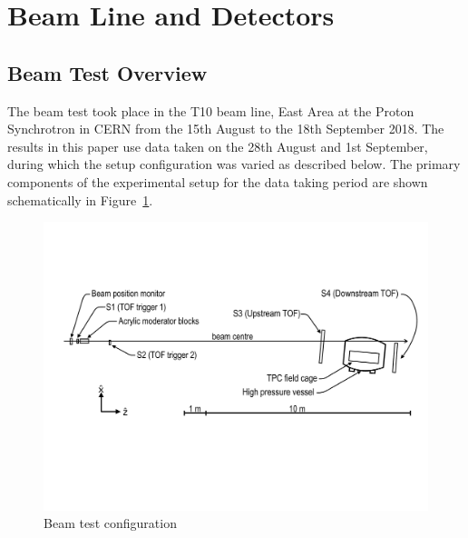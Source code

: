 \section{Beam Line and Detectors}
\label{hptpcPaper:sec:Methods}

\subsection{Beam Test Overview}
The beam test took place in the T10 beam line, East Area at the Proton Synchrotron in CERN from the 15th August to the 18th September 2018.
The results in this paper use data taken on the 28th August and 1st September, during which the setup configuration was varied as described below.
The primary components of the  experimental setup for the data taking period are shown schematically in Figure~\ref{fig:setup}.

\begin{figure}
  \includegraphics[width=1.0\linewidth]{files/Figures/hptpc_t10_planview.pdf}
  \caption{Beam test configuration}
  \label{fig:setup}
\end{figure}

